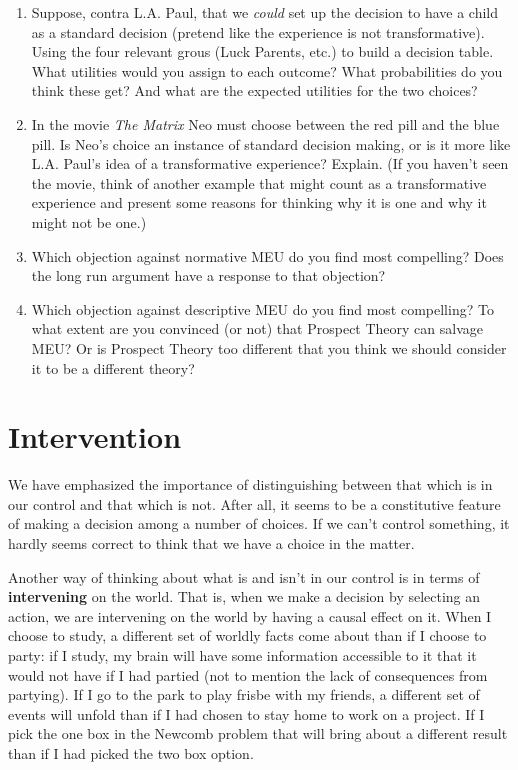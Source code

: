 \documentclass[]{tufte-book}
\begin{document}
\begin{enumerate}
\def\labelenumi{\arabic{enumi}.}
\item
  Suppose, contra L.A. Paul, that we \emph{could} set up the decision to have a child as a standard decision (pretend like the experience is not transformative). Using the four relevant grous (Luck Parents, etc.) to build a decision table. What utilities would you assign to each outcome? What probabilities do you think these get? And what are the expected utilities for the two choices?
\item
  In the movie \emph{The Matrix} Neo must choose between the red pill and the blue pill. Is Neo's choice an instance of standard decision making, or is it more like L.A. Paul's idea of a transformative experience? Explain. (If you haven't seen the movie, think of another example that might count as a transformative experience and present some reasons for thinking why it is one and why it might not be one.)
\item
  Which objection against normative MEU do you find most compelling? Does the long run argument have a response to that objection?
\item
  Which objection against descriptive MEU do you find most compelling? To what extent are you convinced (or not) that Prospect Theory can salvage MEU? Or is Prospect Theory too different that you think we should consider it to be a different theory?
\end{enumerate}

\hypertarget{intervention}{%
\chapter{Intervention}\label{intervention}}

We have emphasized the importance of distinguishing between that which is in our control and that which is not. After all, it seems to be a constitutive feature of making a decision among a number of choices. If we can't control something, it hardly seems correct to think that we have a choice in the matter.

Another way of thinking about what is and isn't in our control is in terms of \textbf{intervening} on the world. That is, when we make a decision by selecting an action, we are intervening on the world by having a causal effect on it. When I choose to study, a different set of worldly facts come about than if I choose to party: if I study, my brain will have some information accessible to it that it would not have if I had partied (not to mention the lack of consequences from partying). If I go to the park to play frisbe with my friends, a different set of events will unfold than if I had chosen to stay home to work on a project. If I pick the one box in the Newcomb problem that will bring about a different result than if I had picked the two box option.
\end{document}
